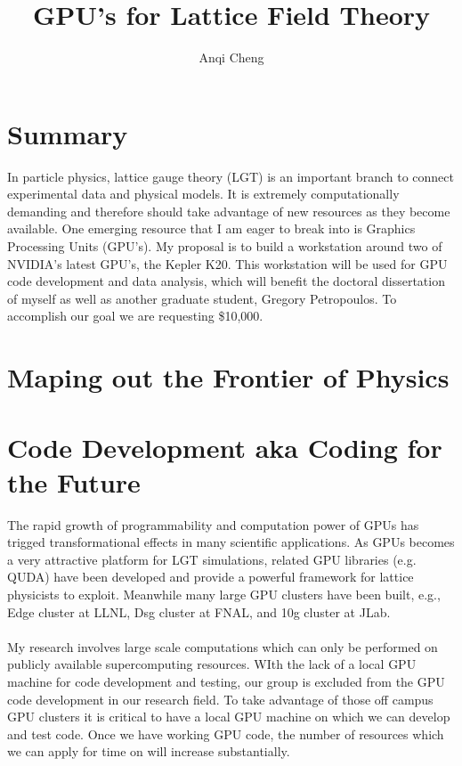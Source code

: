 \documentclass[11pt]{article}
\begin{document}
  \title{GPU's for Lattice Field Theory}
  \author{Anqi Cheng}
  \maketitle

   \section*{Summary} %
In particle physics, lattice gauge theory (LGT) is an important branch to connect experimental data and physical models.
It is extremely computationally demanding and therefore should take advantage of new  resources as they become available.
One emerging resource that I am eager to break into is Graphics Processing Units (GPU's).   
My proposal is to build a workstation around two of NVIDIA's latest GPU's, the Kepler K20.  
This workstation will be used for GPU code development and data analysis, which will benefit the doctoral dissertation of myself 
as well as another graduate student, Gregory Petropoulos.  
To accomplish our goal we are requesting \$10,000.  
 
  \section*{Maping out the Frontier of Physics} %
  
  
  \section*{Code Development aka Coding for the Future} %
 The rapid growth of programmability and computation power of GPUs has trigged transformational effects in many scientific applications. As GPUs becomes 
 a very attractive platform for LGT simulations, related GPU libraries (e.g. QUDA) have been developed and  
 provide a powerful framework for lattice physicists to exploit. Meanwhile many large GPU clusters have been built, e.g., Edge cluster at LLNL,
 Dsg cluster at FNAL, and 10g cluster at JLab.\\\\
 My research involves large scale computations which can only be performed on publicly available supercomputing resources. WIth the lack of a local GPU machine for code development and testing, our group is excluded from the GPU code development in our research field. 
 To take advantage of those off campus GPU clusters it is critical to have a local GPU machine on which we can develop and test code. 
 Once we have working GPU code, the number of resources which we can apply for time on will increase substantially.\\\\
\end{document}
